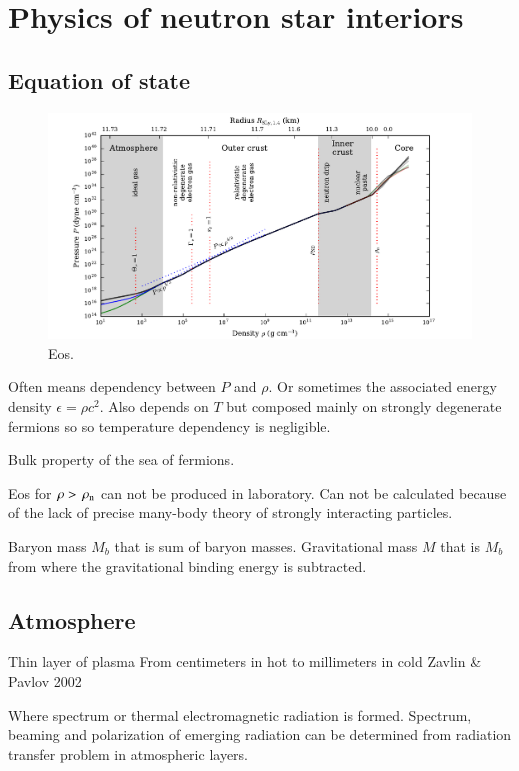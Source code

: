 \chapter{Physics of neutron star interiors} 



\section{Equation of state}

\begin{figure}
\centering
\includegraphics[width=16cm]{notes/eos/eos.pdf}
\caption{\label{fig:eos}
Eos.
}
\end{figure}

Often means dependency between $P$ and $\rho$. 
Or sometimes the associated energy density $\epsilon = \rho c^2$.
Also depends on $T$ but composed mainly on strongly degenerate fermions so so temperature dependency is negligible.

Bulk property of the sea of fermions.

Eos for $\rho > \, \rho_{\mathrm{n}} $ can not be produced in laboratory.
Can not be calculated because of the lack of precise many-body theory of strongly interacting particles.


Baryon mass $M_b$ that is sum of baryon masses.
Gravitational mass $M$ that is $M_b$ from where the gravitational binding energy is subtracted. \cite{Zwicky38}


\section{Atmosphere}
Thin layer of plasma
From centimeters in hot to millimeters in cold 
Zavlin \& Pavlov 2002

Where spectrum or thermal electromagnetic radiation is formed.
Spectrum, beaming and polarization of emerging radiation can be determined from radiation transfer problem in atmospheric layers.

